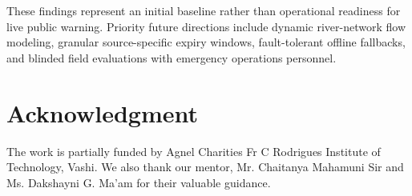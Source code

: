 \documentclass[conference]{IEEEtran}
\begin{document}
These findings represent an initial baseline rather than operational readiness for live public warning. Priority future directions include dynamic river-network flow modeling, granular source-specific expiry windows, fault-tolerant offline fallbacks, and blinded field evaluations with emergency operations personnel.

\section*{Acknowledgment}
The work is partially funded by Agnel Charities Fr C Rodrigues Institute of Technology, Vashi. We also thank our mentor, Mr. Chaitanya Mahamuni Sir and Ms. Dakshayni G. Ma'am for their valuable guidance.

\def\IEEEbibitemsep{-1.2pt plus 0.4pt}
\end{document}
